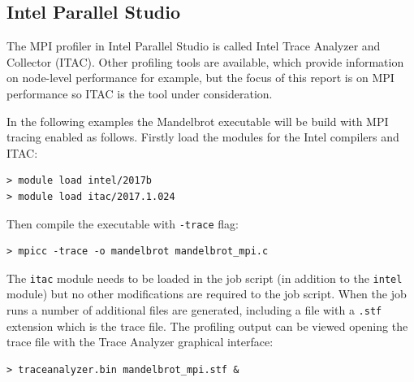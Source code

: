 \documentclass[a4paper,titlepage]{article}
\begin{document}

\subsection{Intel Parallel Studio}

The MPI profiler in Intel Parallel Studio is called Intel Trace Analyzer and Collector (ITAC). Other profiling tools are available, which provide information on node-level performance for example, but the focus of this report is on MPI performance so ITAC is the tool under consideration.

In the following examples the Mandelbrot executable will be build with MPI tracing enabled as follows. Firstly load the modules for the Intel compilers and ITAC: 
\begin{verbatim}
> module load intel/2017b
> module load itac/2017.1.024
\end{verbatim}
Then compile the executable with \texttt{-trace} flag:
\begin{verbatim}
> mpicc -trace -o mandelbrot mandelbrot_mpi.c
\end{verbatim}
The \texttt{itac} module needs to be loaded in the job script (in addition to the \texttt{intel} module) but no other modifications are required to the job script. When the job runs a number of additional files are generated, including a file with a \texttt{.stf} extension which is the trace file.
The profiling output can be viewed opening the trace file with the Trace Analyzer graphical interface:
\begin{verbatim}
> traceanalyzer.bin mandelbrot_mpi.stf &
\end{verbatim}
\end{document}
